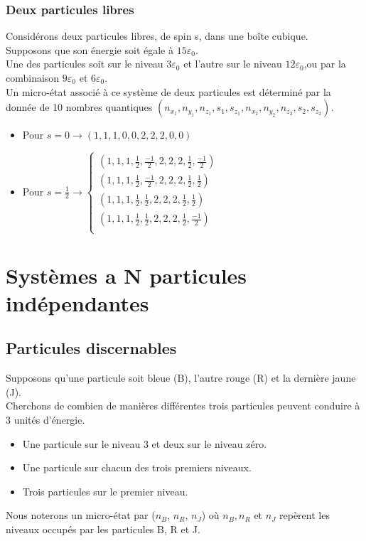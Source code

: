\documentclass[12pt,oneside]{book}
\begin{document}
\subsubsection{Deux particules libres}
Considérons deux particules libres, de spin s, dans une boîte cubique.\\
Supposons que son énergie soit égale à $15\varepsilon_0$.\\
Une des particules soit sur le niveau $3\varepsilon_0$ et l'autre sur le niveau $12\varepsilon_0$,ou par la combinaison $9\varepsilon_0$ et $6\varepsilon_0$.\\
Un micro-état associé à ce système de deux particules est déterminé par la donnée de 10 nombres quantiques $(n_{x_1},n_{y_1},n_{z_1},s_1,s_{z_1},n_{x_2},n_{y_2},n_{z_2},s_2,s_{z_2})$.\\
\begin{itemize}
	\item Pour $s=0 \to (1,1,1,0,0,2,2,2,0,0)$
	\item Pour $s = \frac{1}{2} \to \begin{cases}
			      \textstyle(1,1,1,\frac{1}{2},\frac{-1}{2},2,2,2,\frac{1}{2},\frac{-1}{2}) \\
			      \textstyle(1,1,1,\frac{1}{2},\frac{-1}{2},2,2,2,\frac{1}{2},\frac{1}{2})  \\
			      \textstyle(1,1,1,\frac{1}{2},\frac{1}{2},2,2,2,\frac{1}{2},\frac{1}{2})   \\
			      \textstyle(1,1,1,\frac{1}{2},\frac{1}{2},2,2,2,\frac{1}{2},\frac{-1}{2})  \\
		      \end{cases}$
\end{itemize}
\section{Systèmes a N particules indépendantes}
\subsection{Particules discernables}
Supposons qu'une particule soit bleue (B), l'autre rouge (R) et la dernière jaune (J).\\
Cherchons de combien de manières différentes trois particules peuvent conduire à 3 unités d'énergie.
\begin{itemize}
	\item Une particule sur le niveau 3 et deux sur le niveau zéro.
	\item Une particule sur chacun des trois premiers niveaux.
	\item Trois particules sur le premier niveau.
\end{itemize}
Nous noterons un micro-état par ($n_B$, $n_R$, $n_J$) où $n_B,n_R$ et $n_J$ repèrent les niveaux occupés par les particules B, R et J.\\
\end{document}
